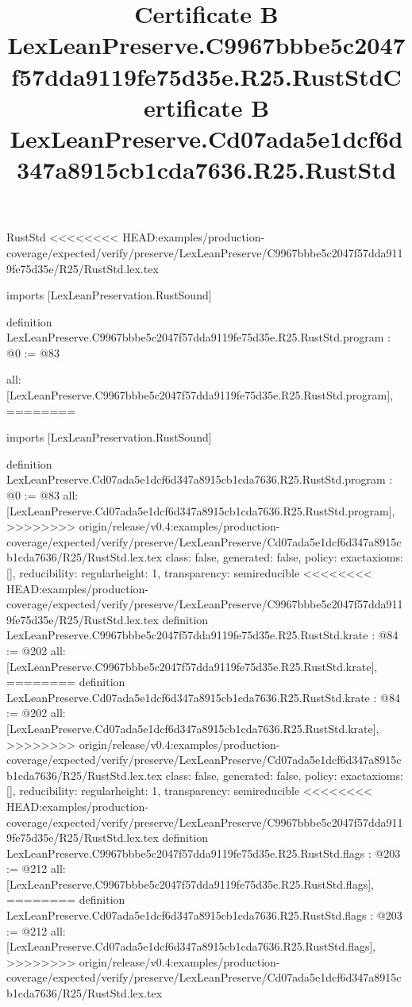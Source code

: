\begin{lexlean}{RustStd}
<<<<<<<< HEAD:examples/production-coverage/expected/verify/preserve/LexLeanPreserve/C9967bbbe5c2047f57dda9119fe75d35e/R25/RustStd.lex.tex
\title{Certificate B LexLeanPreserve.C9967bbbe5c2047f57dda9119fe75d35e.R25.RustStd}
\begin{coremodule}
imports [LexLeanPreservation.RustSound]

definition LexLeanPreserve.C9967bbbe5c2047f57dda9119fe75d35e.R25.RustStd.program : @0 := @83 {
  all: [LexLeanPreserve.C9967bbbe5c2047f57dda9119fe75d35e.R25.RustStd.program],
========
\title{Certificate B LexLeanPreserve.Cd07ada5e1dcf6d347a8915cb1cda7636.R25.RustStd}
\begin{coremodule}
imports [LexLeanPreservation.RustSound]

definition LexLeanPreserve.Cd07ada5e1dcf6d347a8915cb1cda7636.R25.RustStd.program : @0 := @83 {
  all: [LexLeanPreserve.Cd07ada5e1dcf6d347a8915cb1cda7636.R25.RustStd.program],
>>>>>>>> origin/release/v0.4:examples/production-coverage/expected/verify/preserve/LexLeanPreserve/Cd07ada5e1dcf6d347a8915cb1cda7636/R25/RustStd.lex.tex
  class: false,
  generated: false,
  policy: exact{axioms: []},
  reducibility: regular{height: 1},
  transparency: semireducible
}
<<<<<<<< HEAD:examples/production-coverage/expected/verify/preserve/LexLeanPreserve/C9967bbbe5c2047f57dda9119fe75d35e/R25/RustStd.lex.tex
definition LexLeanPreserve.C9967bbbe5c2047f57dda9119fe75d35e.R25.RustStd.krate : @84 := @202 {
  all: [LexLeanPreserve.C9967bbbe5c2047f57dda9119fe75d35e.R25.RustStd.krate],
========
definition LexLeanPreserve.Cd07ada5e1dcf6d347a8915cb1cda7636.R25.RustStd.krate : @84 := @202 {
  all: [LexLeanPreserve.Cd07ada5e1dcf6d347a8915cb1cda7636.R25.RustStd.krate],
>>>>>>>> origin/release/v0.4:examples/production-coverage/expected/verify/preserve/LexLeanPreserve/Cd07ada5e1dcf6d347a8915cb1cda7636/R25/RustStd.lex.tex
  class: false,
  generated: false,
  policy: exact{axioms: []},
  reducibility: regular{height: 1},
  transparency: semireducible
}
<<<<<<<< HEAD:examples/production-coverage/expected/verify/preserve/LexLeanPreserve/C9967bbbe5c2047f57dda9119fe75d35e/R25/RustStd.lex.tex
definition LexLeanPreserve.C9967bbbe5c2047f57dda9119fe75d35e.R25.RustStd.flags : @203 := @212 {
  all: [LexLeanPreserve.C9967bbbe5c2047f57dda9119fe75d35e.R25.RustStd.flags],
========
definition LexLeanPreserve.Cd07ada5e1dcf6d347a8915cb1cda7636.R25.RustStd.flags : @203 := @212 {
  all: [LexLeanPreserve.Cd07ada5e1dcf6d347a8915cb1cda7636.R25.RustStd.flags],
>>>>>>>> origin/release/v0.4:examples/production-coverage/expected/verify/preserve/LexLeanPreserve/Cd07ada5e1dcf6d347a8915cb1cda7636/R25/RustStd.lex.tex
}}}
\end{coremodule}}
\end{coremodule}
\end{lexlean}
